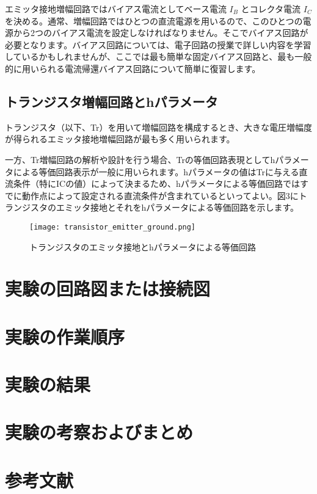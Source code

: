 \documentclass[a4paper,11pt,xelatex,ja=standard]{bxjsarticle}
\begin{document}
    エミッタ接地増幅回路ではバイアス電流としてベース電流 $I_B$ とコレクタ電流 $I_C$ を決める。通常、増幅回路ではひとつの直流電源を用いるので、このひとつの電源から2つのバイアス電流を設定しなければなりません。そこでバイアス回路が必要となります。バイアス回路については、電子回路の授業で詳しい内容を学習しているかもしれませんが、ここでは最も簡単な固定バイアス回路と、最も一般的に用いられる電流帰還バイアス回路について簡単に復習します。

    \subsection{トランジスタ増幅回路とhパラメータ}

    トランジスタ（以下、Tr）を用いて増幅回路を構成するとき、大きな電圧増幅度が得られるエミッタ接地増幅回路が最も多く用いられます。

    一方、Tr増幅回路の解析や設計を行う場合、Trの等価回路表現としてhパラメータによる等価回路表示が一般に用いられます。hパラメータの値はTrに与える直流条件（特にICの値）によって決まるため、hパラメータによる等価回路ではすでに動作点によって設定される直流条件が含まれているといってよい。図3にトランジスタのエミッタ接地とそれをhパラメータによる等価回路を示します。

    \begin{figure}[h]
    \centering
    \texttt{[image: transistor\_emitter\_ground.png]}
    \caption{トランジスタのエミッタ接地とhパラメータによる等価回路}
    \end{figure}

\section{実験の回路図または接続図}
\section{実験の作業順序}
\section{実験の結果}
\section{実験の考察およびまとめ}
\section{参考文献}
\end{document}
